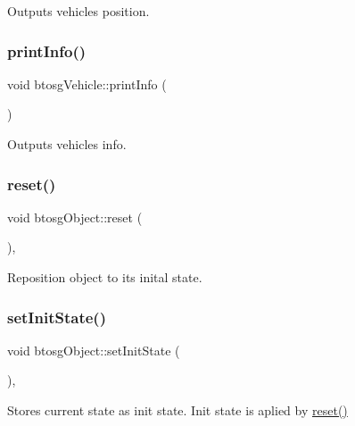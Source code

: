 Outputs vehicle\textquotesingle{}s position. \mbox{\label{classbtosgVehicle_abe98f64f0a8f37c7c0b244e3afbbcb15}} 
\subsubsection{\texorpdfstring{printInfo()}{printInfo()}}
{\footnotesize\ttfamily void btosg\+Vehicle\+::print\+Info (\begin{DoxyParamCaption}{ }\end{DoxyParamCaption})\hspace{0.3cm}{\ttfamily [inline]}}

Outputs vehicle\textquotesingle{}s info. \mbox{\label{classbtosgObject_a93983f9180dd0672f8779cf2baa78580}} 
\subsubsection{\texorpdfstring{reset()}{reset()}}
{\footnotesize\ttfamily void btosg\+Object\+::reset (\begin{DoxyParamCaption}{ }\end{DoxyParamCaption})\hspace{0.3cm}{\ttfamily [inline]}, {\ttfamily [inherited]}}

Reposition object to its inital state. \mbox{\label{classbtosgObject_ad1508a0ce28cfac83e5f0ff6245f91b5}} 
\subsubsection{\texorpdfstring{setInitState()}{setInitState()}\hspace{0.1cm}{\footnotesize\ttfamily [1/2]}}
{\footnotesize\ttfamily void btosg\+Object\+::set\+Init\+State (\begin{DoxyParamCaption}{ }\end{DoxyParamCaption})\hspace{0.3cm}{\ttfamily [inline]}, {\ttfamily [inherited]}}

Stores current state as init state. Init state is aplied by \mbox{\hyperlink{classbtosgObject_a93983f9180dd0672f8779cf2baa78580}{reset()}} \mbox{\label{classbtosgObject_a6ceb08e59ee95acaaef389ee198d2b56}} 

